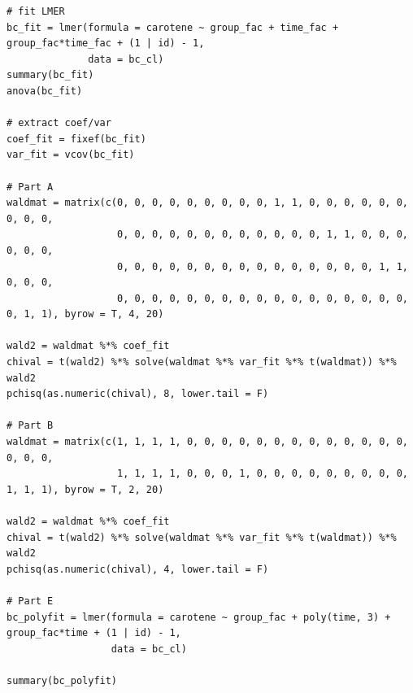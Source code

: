 \documentclass[11pt,a4paper]{article}
\begin{document}
\begin{verbatim}
# fit LMER
bc_fit = lmer(formula = carotene ~ group_fac + time_fac + group_fac*time_fac + (1 | id) - 1,
              data = bc_cl)
summary(bc_fit)
anova(bc_fit)

# extract coef/var
coef_fit = fixef(bc_fit)
var_fit = vcov(bc_fit)

# Part A
waldmat = matrix(c(0, 0, 0, 0, 0, 0, 0, 0, 0, 1, 1, 0, 0, 0, 0, 0, 0, 0, 0, 0,
                   0, 0, 0, 0, 0, 0, 0, 0, 0, 0, 0, 0, 1, 1, 0, 0, 0, 0, 0, 0,
                   0, 0, 0, 0, 0, 0, 0, 0, 0, 0, 0, 0, 0, 0, 0, 1, 1, 0, 0, 0,
                   0, 0, 0, 0, 0, 0, 0, 0, 0, 0, 0, 0, 0, 0, 0, 0, 0, 0, 1, 1), byrow = T, 4, 20)

wald2 = waldmat %*% coef_fit
chival = t(wald2) %*% solve(waldmat %*% var_fit %*% t(waldmat)) %*% wald2
pchisq(as.numeric(chival), 8, lower.tail = F)

# Part B
waldmat = matrix(c(1, 1, 1, 1, 0, 0, 0, 0, 0, 0, 0, 0, 0, 0, 0, 0, 0, 0, 0, 0,
                   1, 1, 1, 1, 0, 0, 0, 1, 0, 0, 0, 0, 0, 0, 0, 0, 0, 1, 1, 1), byrow = T, 2, 20)

wald2 = waldmat %*% coef_fit
chival = t(wald2) %*% solve(waldmat %*% var_fit %*% t(waldmat)) %*% wald2
pchisq(as.numeric(chival), 4, lower.tail = F)

# Part E
bc_polyfit = lmer(formula = carotene ~ group_fac + poly(time, 3) + group_fac*time + (1 | id) - 1,
                  data = bc_cl)

summary(bc_polyfit)
\end{verbatim}
\end{document}
